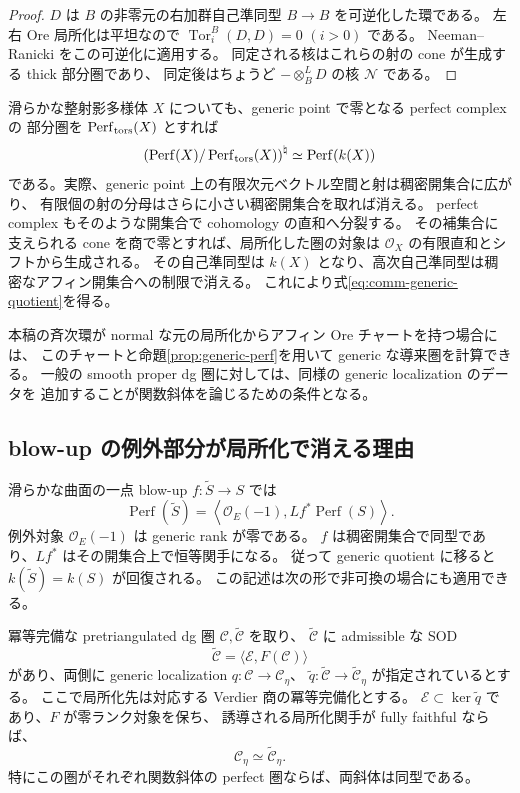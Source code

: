 \begin{proof}
$D$ は $B$ の非零元の右加群自己準同型 $B\to B$ を可逆化した環である。
左右 Ore 局所化は平坦なので $\operatorname{Tor}^B_i(D,D)=0$ $(i>0)$ である。
Neeman--Ranicki \cite[定理0.7]{NeemanRanicki} をこの可逆化に適用する。
同定される核はこれらの射の cone が生成する thick 部分圏であり、
同定後はちょうど $-\otimes_B^LD$ の核 $\mathcal N$ である。
\end{proof}

滑らかな整射影多様体 $X$ についても、generic point で零となる perfect complex の
部分圏を $\operatorname{Perf}_{\rm tors}(X)$ とすれば
\begin{equation}\label{eq:comm-generic-quotient}
 \left(\operatorname{Perf}(X)/\operatorname{Perf}_{\rm tors}(X)\right)^\natural
 \simeq\operatorname{Perf}(k(X))
\end{equation}
である。実際、generic point 上の有限次元ベクトル空間と射は稠密開集合に広がり、
有限個の射の分母はさらに小さい稠密開集合を取れば消える。
perfect complex もそのような開集合で cohomology の直和へ分裂する。
その補集合に支えられる cone を商で零とすれば、局所化した圏の対象は
$\mathcal O_X$ の有限直和とシフトから生成される。
その自己準同型は $k(X)$ となり、高次自己準同型は稠密なアフィン開集合への制限で消える。
これにより式\eqref{eq:comm-generic-quotient}を得る。

本稿の斉次環が normal な元の局所化からアフィン Ore チャートを持つ場合には、
このチャートと命題\ref{prop:generic-perf}を用いて generic な導来圏を計算できる。
一般の smooth proper dg 圏に対しては、同様の generic localization のデータを
追加することが関数斜体を論じるための条件となる。

\subsection{blow-up の例外部分が局所化で消える理由}

滑らかな曲面の一点 blow-up $f:\widetilde S\to S$ では
\[
 \operatorname{Perf}(\widetilde S)=
 \left\langle\mathcal O_E(-1),Lf^*\operatorname{Perf}(S)\right\rangle.
\]
例外対象 $\mathcal O_E(-1)$ は generic rank が零である。
$f$ は稠密開集合で同型であり、$Lf^*$ はその開集合上で恒等関手になる。
従って generic quotient に移ると $k(\widetilde S)=k(S)$ が回復される。
この記述は次の形で非可換の場合にも適用できる。

\begin{proposition}\label{prop:sod-compatible-generic}
冪等完備な pretriangulated dg 圏 $\mathcal C,\widetilde{\mathcal C}$ を取り、
$\widetilde{\mathcal C}$ に admissible な SOD
\[
 \widetilde{\mathcal C}=\langle\mathcal E,F(\mathcal C)\rangle
\]
があり、両側に generic localization
$q:\mathcal C\to\mathcal C_\eta$、
$\widetilde q:\widetilde{\mathcal C}\to\widetilde{\mathcal C}_\eta$ が指定されているとする。
ここで局所化先は対応する Verdier 商の冪等完備化とする。
$\mathcal E\subset\ker\widetilde q$ であり、$F$ が零ランク対象を保ち、
誘導される局所化関手が fully faithful ならば、
\[
 \mathcal C_\eta\simeq\widetilde{\mathcal C}_\eta.
\]
特にこの圏がそれぞれ関数斜体の perfect 圏ならば、両斜体は同型である。
\end{proposition}

